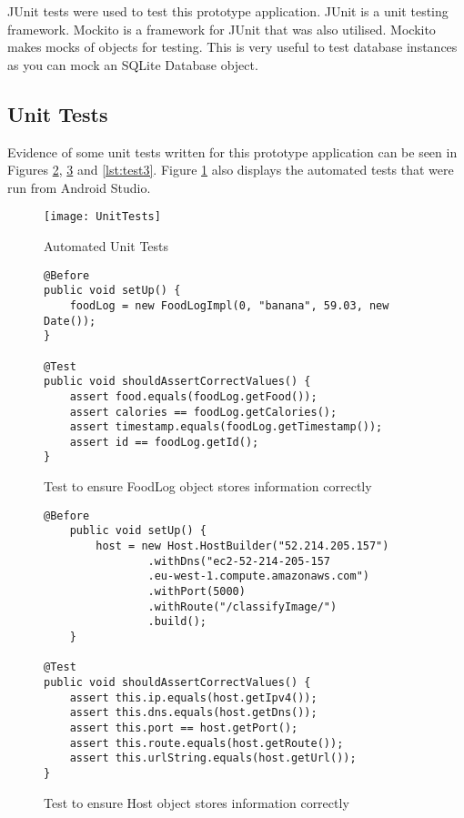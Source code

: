 JUnit tests were used to test this prototype application.
JUnit is a unit testing framework.
Mockito is a framework for JUnit that was also utilised.
Mockito makes mocks of objects for testing.
This is very useful to test database instances as you can mock an SQLite Database object.

\tocless\subsection{Unit Tests}
Evidence of some unit tests written for this prototype application can be seen in Figures \ref{lst:test1}, \ref{lst:test2} and \ref{lst:test3}.
Figure \ref{fig:unitTests} also displays the automated tests that were run from Android Studio.

\begin{figure}[h]
    \texttt{[image: UnitTests]}
    \caption{Automated Unit Tests}
    \label{fig:unitTests}
\end{figure}

\begin{figure}[h]
\caption{Test to ensure FoodLog object stores information correctly}
\label{lst:test1}
\begin{lstlisting}[style=Java]
@Before
public void setUp() {
    foodLog = new FoodLogImpl(0, "banana", 59.03, new Date());
}

@Test
public void shouldAssertCorrectValues() {
    assert food.equals(foodLog.getFood());
    assert calories == foodLog.getCalories();
    assert timestamp.equals(foodLog.getTimestamp());
    assert id == foodLog.getId();
}
\end{lstlisting}
\end{figure}

\begin{figure}[h]
\caption{Test to ensure Host object stores information correctly}
\label{lst:test2}
\begin{lstlisting}[style=Java]
@Before
    public void setUp() {
        host = new Host.HostBuilder("52.214.205.157")
                .withDns("ec2-52-214-205-157
                .eu-west-1.compute.amazonaws.com")
                .withPort(5000)
                .withRoute("/classifyImage/")
                .build();
    }

@Test
public void shouldAssertCorrectValues() {
    assert this.ip.equals(host.getIpv4());
    assert this.dns.equals(host.getDns());
    assert this.port == host.getPort();
    assert this.route.equals(host.getRoute());
    assert this.urlString.equals(host.getUrl());
}
\end{lstlisting}
\end{figure}

